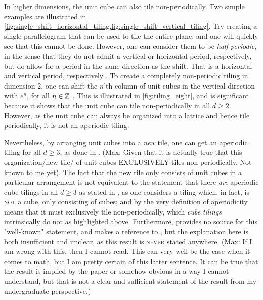 \documentclass[../thesis.tex]{subfiles}
\begin{document}
In higher dimensions, the unit cube can also tile non-periodically. Two simple examples are illustrated in \cref{fig:single_shift_horizontal_tiling,fig:single_shift_vertical_tiling}. Try creating a single parallelogram that can be used to tile the entire plane, and one will quickly see that this cannot be done. However, one can consider them to be \emph{half-periodic}, in the sense that they do not admit a vertical or horizontal period, respectively, but do allow for a period in the same direction as the shift. That is a horizontal and vertical period, respectively \cite{kolountzakisTilingsTranslation2010}. To create a completely non-periodic tiling in dimension $2$, one can shift the $n$'th column of unit cubes in the vertical direction with $e^n$, for all $n\in\mathbb{Z}$ \cite{liuUniformityNonUniformGabor2003}. This is illustrated in \cref{fig:tiling_eight}, and is significant because it shows that the unit cube can tile non-periodically in all $d\geq 2$. However, as the unit cube can always be organized into a lattice and hence tile periodically, it is not an aperiodic tiling.
\begin{remark}
    Nevertheless, by arranging unit cubes into a \emph{new} tile, one can get an aperiodic tiling for all $d\geq3$, as done in \cite{lagariasKellerCubetilingConjecture1992}. (Max: Given that it is actually true that this organization/new tile/ of unit cubes EXCLUSIVELY tiles non-periodically. Not known to me yet). The fact that the new tile only consists of unit cubes in a particular arrangement is not equivalent to the statement that there \emph{are} aperiodic cube tilings in all $d\geq3$ as stated in \cite{lagariasOrthonormalBasesExponentials2000,liuUniformityNonUniformGabor2003}, as one considers a tiling which, in fact, is \textsc{not} a cube, only consisting of cubes; and by the very definition of aperiodicity means that it must exclusively tile non-periodically, which \emph{cube tilings} intrinsically do not as highlighted above. Furthermore, \cite{lagariasOrthonormalBasesExponentials2000} provides no source for this "well-known" statement, and \cite{liuUniformityNonUniformGabor2003} makes a reference to \cite{lagariasKellerCubetilingConjecture1992}, but the explanation here is both insufficient and unclear, as this result is \textsc{never} stated anywhere. (Max: If I am wrong with this, then I cannot read. This can very well be the case when it comes to math, but I am pretty certain of this latter sentence. It can be true that the result is implied by the paper or somehow obvious in a way I cannot understand, but that is not a clear and sufficient statement of the result from my undergraduate perspective.)
\end{remark}
\end{document}
